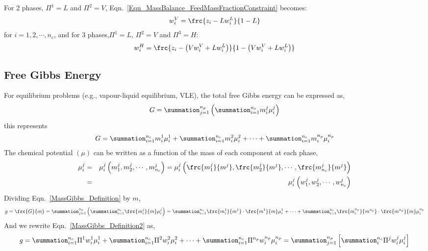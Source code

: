 For 2 phases, $\Pi^{1}=L$ and $\Pi^{2}=V$, Eqn.~\ref{Eqn_MassBalance_FeedMassFractionConstraint} becomes:
\begin{displaymath}
w_{i}^{V} = \frc{z_{i}-Lw_{i}^{L}}{1-L}
\end{displaymath}
for $i=1,2,\cdots,n_{c}$, and for 3 phases,$\Pi^{1}=L$, $\Pi^{2}=V$ and $\Pi^{3}=H$:
\begin{displaymath}
w_{i}^{H} = \frc{z_{i}-\left(V w_{i}^{V} + L w_{i}^{L}\right)}{1 - \left(V w_{i}^{V} + L w_{i}^{L}\right)}
\end{displaymath}

\subsection{Free Gibbs Energy}
For equilibrium problems (e.g., vapour-liquid equilibrium, VLE), the total free Gibbs energy can be expressed as,
\begin{equation}
G = \summation_{j=1}^{n_{p}}\left(\summation_{i=1}^{n_{c}} m_{i}^{j}\mu_{i}^{j}\right)
\label{MassGibbs_Definition}
\end{equation} 
this represents
\begin{displaymath}
G = \summation_{i=1}^{n_{c}} m_{i}^{1}\mu_{i}^{1} + \summation_{i=1}^{n_{c}} m_{i}^{2}\mu_{i}^{2} + \cdots + \summation_{i=1}^{n_{c}} m_{i}^{n_{p}}\mu_{i}^{n_{p}}
\end{displaymath}
The chemical potential $\left(\mu\right)$ can be written as a function of the mass of each component at each phase,
\begin{eqnarray}
\mu_{i}^{j} &=& \mu_{i}^{j}\left(m_{1}^{j}, m_{2}^{j}, \cdots, m_{n_{c}}^{j}\right) = \mu_{i}^{j}\left(\frc{m_{1}^{j}}{m^{j}}, \frc{m_{2}^{j}}{m^{j}}, \cdots, \frc{m_{n_{c}}^{j}}{m^{j}}\right)\nonumber \\
 &=& \mu_{i}^{j}\left(w_{1}^{j}, w_{2}^{j}, \cdots, w_{n_{c}}^{j}\right)\label{chempotential_functional}
\end{eqnarray}
Dividing Eqn.~\ref{MassGibbs_Definition} by $m$,
\begin{equation}
g = \frc{G}{m} = \summation_{j=1}^{n_{p}}\left(\summation_{i=1}^{n_{c}}\frc{m_{i}^{j}}{m}\mu_{i}^{j}\right) = \summation_{i=1}^{n_{c}}\frc{m_{i}^{1}}{m^{1}} \cdot \frc{m^{1}}{m} \mu_{i}^{1} + \cdots + \summation_{i=1}^{n_{c}}\frc{m_{i}^{n_{p}}}{m^{n_{p}}} \cdot \frc{m^{n_{p}}}{m} \mu_{i}^{n_{p}}
\label{MassGibbs_Definition2}
\end{equation}
And we rewrite Eqn.~\ref{MassGibbs_Definition2} as,
\begin{equation}
g = \summation_{i=1}^{n_{c}}\Pi^{1}w_{i}^{1}\mu_{i}^{1} + \summation_{i=1}^{n_{c}}\Pi^{2}w_{i}^{2}\mu_{i}^{2} + \cdots + \summation_{i=1}^{n_{c}}\Pi^{n_{p}}w_{i}^{n_{p}}\mu_{i}^{n_{p}} = \summation_{j=1}^{n_{p}}\left[\summation_{i}^{n_{c}}\Pi^{j}w_{i}^{j}\mu_{i}^{j}\right] \label{MassGibbs_Definition3}
\end{equation}



